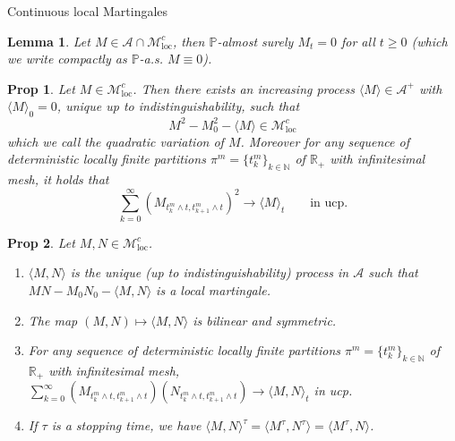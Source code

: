 \documentclass[a4paper]{article}
\theoremstyle{mytheoremstyle}
\newtheorem{lemma}{Lemma}
\newtheorem{proposition}{Prop}
\newcommand{\1}{\mathds{1}}
\begin{document}
\begin{multicols*}{3}
\begin{roundbox}{Continuous local Martingales}
\begin{lemma}
  \label{lem:locmart not fv}Let $M \in \mathcal{A} \cap
  \mathcal{M}^c_{\operatorname{loc}}$, then $\mathbb{P}$-almost surely $M_t = 0$ for
  all $t \geqslant 0$ (which we write compactly as $\mathbb{P}$-a.s. $M \equiv 0$).
\end{lemma}

\begin{proposition}
  \label{prop:qvlocMG}Let $M \in \mathcal{M}^c_{\mathrm{loc}}$. Then there
  exists an increasing process $\langle M \rangle \in \mathcal{A}^+$ with
  $\langle M \rangle_0 = 0$, unique up to indistinguishability, such that
  \begin{equation}
    M^2 - M^2_0 - \langle M \rangle \in \mathcal{M}^c_{\mathrm{loc}}
    \label{eq:qvlocMG}
  \end{equation}
  which we call the {\emph{quadratic variation}} of $M$. Moreover for any
  sequence of deterministic locally finite partitions $\pi^m = \{ t^m_k \}_{k
  \in \mathbb{N}}$ of $\mathbb{R}_+$ with infinitesimal mesh, it holds that
  \begin{equation}
    \sum_{k = 0}^{\infty} \left(M_{t^m_k \wedge t, t^m_{k + 1} \wedge t} \right)^2
    \rightarrow \langle M \rangle_t \qquad \text{in ucp} . \label{eq:qvlocMG2}
  \end{equation}
\end{proposition}

\begin{proposition}
  \label{prop:qcv.local.mart}Let $M, N \in \mathcal{M}_{\operatorname{loc}}^c$.
  \begin{enumerate}
    \item $\langle M, N \rangle$ is the unique (up to indistinguishability)
    process in $\mathcal{A}$ such that $MN - M_0 N_0 - \langle M, N \rangle$
    is a local martingale.
    
    \item The map $(M, N) \mapsto \langle M, N \rangle$ is bilinear and
    symmetric.
    
    \item For any sequence of deterministic locally finite partitions $\pi^m =
    \{ t^m_k \}_{k \in \mathbb{N}}$ of $\mathbb{R}_+$ with infinitesimal mesh,
    $\sum_{k = 0}^{\infty} (M_{t^m_k \wedge t, t^m_{k + 1} \wedge t})
    (N_{t^m_k \wedge t, t^m_{k + 1} \wedge t}) \rightarrow \langle M, N
    \rangle_t$ in ucp.
    
    \item If $\tau$ is a stopping time, we have $\langle M, N \rangle^{\tau} =
    \langle M^{\tau}, N^{\tau} \rangle = \langle M^{\tau}, N \rangle$.
    

\end{enumerate}
\end{proposition}
\end{roundbox}
\end{multicols*}
\end{document}
